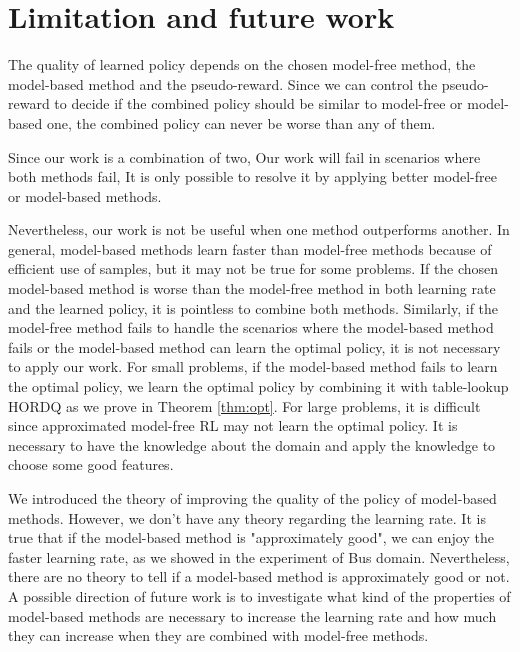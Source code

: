 \section{Limitation and future work}

The quality of learned policy depends on the chosen model-free method,
the model-based method and the pseudo-reward. 
Since we can control the pseudo-reward to decide if the combined
policy should be similar to model-free or model-based one,
the combined policy can never be worse than any of them. 

Since our work is a combination of two,  Our work will fail in scenarios where both methods fail, 
It is only possible to resolve it by applying better model-free or model-based methods. 


Nevertheless, our work is not be useful when one method outperforms another.
In general, model-based methods learn faster than model-free methods because of
efficient use of samples, but it may not be true for some problems. 
If the chosen model-based method is worse than the model-free method in both learning
rate and the learned policy, it is pointless to combine both methods. 
Similarly, if the model-free method fails to handle the scenarios where the model-based
method fails or the model-based method can learn the optimal policy, it is not necessary to apply our work.
For small problems, if the model-based method fails to learn the optimal policy, 
we learn the optimal policy by combining it with table-lookup HORDQ as we prove in Theorem \ref{thm:opt}.
For large problems, it is difficult since approximated model-free RL may not learn the optimal policy.
It is necessary to have the knowledge about the domain and apply the knowledge to choose some good features.

We introduced the theory of improving the quality of the policy of model-based methods. However, we don't have any theory regarding the learning rate.
It is true that if the model-based method is "approximately good", we can enjoy the 
faster learning rate, as we showed in the experiment of Bus domain. Nevertheless, there are no theory
to tell if a model-based method is approximately good or not.
A possible direction of future work is to investigate what kind of the properties of model-based
methods are necessary to increase the learning rate and how much they can increase when they are combined with model-free methods.





